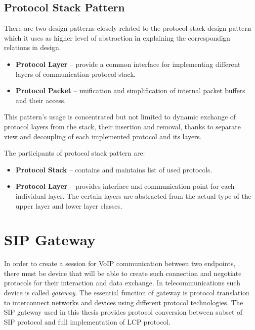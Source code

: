 
\subsection{Protocol Stack Pattern}
There are two design patterns closely related to the protocol stack design 
pattern which it uses as higher level of abstraction in explaining the 
correspondign relations in design.
\begin{itemize}
\item \textbf{Protocol Layer} -- provide a common interface for implementing
different layers of communication protocol stack.
\item \textbf{Protocol Packet} -- unification and simplification of internal
packet buffers and their access.
\end{itemize} 

This pattern's usage is concentrated but not limited to dynamic exchange of 
protocol layers from the stack, their insertion and removal, thanks to separate 
view and decoupling of each implemented protocol and its layers.

The participants of protocol stack pattern are:
\begin{itemize}
\item \textbf{Protocol Stack} -- contains and maintains list of used protocols.
\item \textbf{Protocol Layer} -- provides interface and communication point for 
each individual layer. The certain layers are abstracted from the actual type of
the upper layer and lower layer classes.
\end{itemize}





\section{SIP Gateway}
In order to create a session for VoIP communication between two endpoints, 
there must be device that will be able to create such connection and negotiate
protocols for their interaction and data exchange. In telecommunications such
device is called \textit{gateway}. The essential function of gateway is 
protocol translation to interconnect networks and devices using different
protocol technologies. The SIP gateway used in this thesis provides protocol
conversion between subset of SIP protocol and full implementation of LCP 
protocol.

